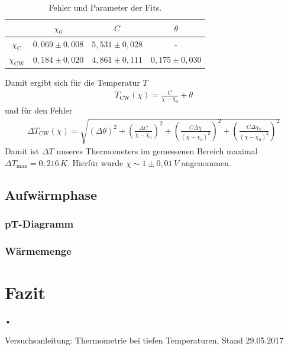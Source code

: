 \documentclass[twoside,colorback,accentcolor=tud4c,11pt]{tudreport}
\begin{document}
\begin{table}[H]
\centering
\begin{tabular}{|c|c|c|c|}
\hline 
 & $ \chi_0 $ & $C$ & $\theta$ \\ 
\hline 
$ \chi_{\text{C}} $ & $ 0,069\pm 0,008 $ & $5,531\pm 0,028 $& - \\ 
\hline 
$ \chi_{\text{CW}} $ & $ 0,184\pm 0,020 $ & $  4,861\pm 0,111$ & $  0,175\pm 0,030$ \\ 
\hline 
\end{tabular} 
\caption{Fehler und Parameter der Fits.}\label{tab:fits}
\end{table}
Damit ergibt sich für die Temperatur $T$
\begin{align}
T_{\text{CW}}(\chi)=\frac{C}{\chi-\chi_0}+\theta
\end{align} 
und für den Fehler
\begin{align}
\Delta T_{\text{CW}}(\chi)=\sqrt{\left(\Delta\theta\right)^2+\left(\frac{\Delta C}{\chi-\chi_0}\right)^2+\left(\frac{C\Delta\chi}{(\chi-\chi_0)^2}\right)^2+\left(\frac{C\Delta\chi_0}{(\chi-\chi_0)^2}\right)^2}
\end{align}
Damit ist $ \Delta T $ unseres Thermometers im gemessenen Bereich maximal $ \Delta T_{\text{max}}=0,216\,\si{K} $. Hierfür wurde $ \chi\sim 1\pm 0,01\,\si{V} $ angenommen.
\section{Aufwärmphase}
\subsection{pT-Diagramm}
\subsection{Wärmemenge}
\chapter{Fazit}	
•
\renewcommand{\bibname}{Literatur}
\begin{thebibliography}{0}
 Versuchsanleitung: Thermometrie bei tiefen Temperaturen, Stand 29.05.2017

\end{thebibliography}
\end{document}
